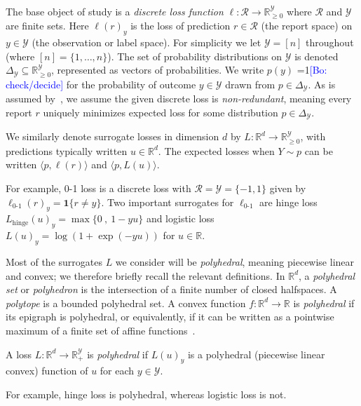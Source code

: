 \documentclass[anon]{colt2020} %
\newcommand{\Comments}{1}
\newcommand{\mynote}[2]{\ifnum\Comments=1\textcolor{#1}{#2}\fi}
\newcommand{\bo}[1]{\mynote{blue}{[Bo: #1]}}
\newcommand{\reals}{\mathbb{R}}
\newcommand{\nonnegreals}{\reals_{\geq 0}}%
\newcommand{\simplex}{\Delta_\Y}
\newcommand{\R}{\mathcal{R}}
\newcommand{\Y}{\mathcal{Y}}
\newcommand{\hinge}{L_{\mathrm{hinge}}}
\newcommand{\ellzo}{\ell_{\text{0-1}}}
\newcommand{\risk}[1]{\underline{#1}}
\newcommand{\inprod}[2]{\langle #1, #2 \rangle}%
\newcommand{\Ind}[1]{\mathbf{1}\{#1\}}
\begin{document}
The base object of study is a \emph{discrete loss function} $\ell: \R \to \nonnegreals^{\Y}$ where $\R$ and $\Y$ are finite sets.
Here $\ell(r)_y$ is the loss of prediction $r \in \R$ (the report space) on $y \in \Y$ (the observation or label space).
For simplicity we let $\Y = [n]$ throughout (where $[n] = \{1,\ldots,n\}$).
The set of probability distributions on $\Y$ is denoted $\simplex\subseteq\nonnegreals^{\Y}$, represented as vectors of probabilities.
We write $p(y)$ \bo{check/decide} for the probability of outcome $y \in \Y$ drawn from $p \in \simplex$.
As is assumed by~\cite{finocchiaro2019embedding}, we assume the given discrete loss is \emph{non-redundant}, meaning every report $r$ uniquely minimizes expected loss for some distribution $p\in\simplex$.

We similarly denote surrogate losses in dimension $d$ by $L:\reals^d\to\nonnegreals^{\Y}$, with predictions typically written $u\in\reals^d$.
The expected losses when $Y \sim p$ can be written $\inprod{p}{\ell(r)}$ and $\inprod{p}{L(u)}$.

For example, 0-1 loss is a discrete loss with $\R = \Y = \{-1,1\}$
given by $\ellzo(r)_y = \Ind{r \neq y}$.%
Two important surrogates for $\ellzo$ are hinge loss $\hinge(u)_y = \max\{ 0 ~,~ 1-yu \}$ and logistic loss $L(u)_y = \log(1+\exp(-yu))$ for $u\in\reals$.

Most of the surrogates $L$ we consider will be \emph{polyhedral}, meaning piecewise linear and convex; we therefore briefly recall the relevant definitions.
In $\reals^d$, a \emph{polyhedral set} or \emph{polyhedron} is the intersection of a finite number of closed halfspaces.
A \emph{polytope} is a bounded polyhedral set.
A convex function $f:\reals^d\to\reals$ is \emph{polyhedral} if its epigraph is polyhedral, or equivalently, if it can be written as a pointwise maximum of a finite set of affine functions~\citep{rockafellar1997convex}.
%
\begin{definition}
	A loss $L: \reals^d \to \reals^{\Y}_+$ is \emph{polyhedral} if $L(u)_y$ is a polyhedral (piecewise linear convex) function of $u$ for each $y\in\Y$.
\end{definition}
%
For example, hinge loss is polyhedral, whereas logistic loss is not.
\end{document}
